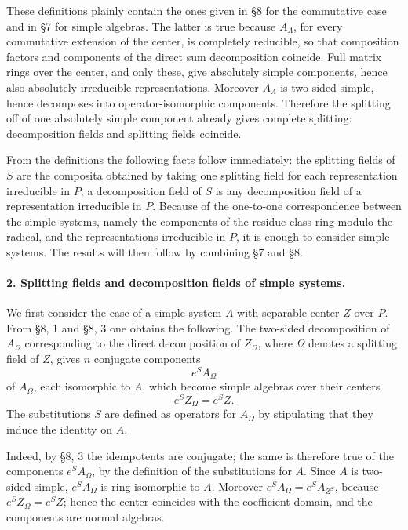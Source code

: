 \documentclass[11pt]{article}
\begin{document}
These definitions plainly contain the ones given in §8 for the commutative case and in §7 for simple algebras. The latter is true because \(A_\Lambda\), for every commutative extension of the center, is completely reducible, so that composition factors and components of the direct sum decomposition coincide. Full matrix rings over the center, and only these, give absolutely simple components, hence also absolutely irreducible representations. Moreover \(A_\Lambda\) is two-sided simple, hence decomposes into operator-isomorphic components. Therefore the splitting off of one absolutely simple component already gives complete splitting: decomposition fields and splitting fields coincide.

From the definitions the following facts follow immediately: the splitting fields of \(S\) are the composita obtained by taking one splitting field for each representation irreducible in \(P\); a decomposition field of \(S\) is any decomposition field of a representation irreducible in \(P\). Because of the one-to-one correspondence between the simple systems, namely the components of the residue-class ring modulo the radical, and the representations irreducible in \(P\), it is enough to consider simple systems. The results will then follow by combining §7 and §8.

\paragraph{2. Splitting fields and decomposition fields of simple systems.}
We first consider the case of a simple system \(A\) with separable center \(Z\) over \(P\). From §8, 1 and §8, 3 one obtains the following. The two-sided decomposition of \(A_\Omega\) corresponding to the direct decomposition of \(Z_\Omega\), where \(\Omega\) denotes a splitting field of \(Z\), gives \(n\) conjugate components
\[
        e^S A_\Omega
\]
of \(A_\Omega\), each isomorphic to \(A\), which become simple algebras over their centers
\[
        e^S Z_\Omega=e^S Z .
\]
The substitutions \(S\) are defined as operators for \(A_\Omega\) by stipulating that they induce the identity on \(A\).

Indeed, by §8, 3 the idempotents are conjugate; the same is therefore true of the components \(e^S A_\Omega\), by the definition of the substitutions for \(A\). Since \(A\) is two-sided simple, \(e^S A_\Omega\) is ring-isomorphic to \(A\). Moreover \(e^SA_\Omega=e^S A_{Z^S}\), because \(e^S Z_\Omega=e^S Z\); hence the center coincides with the coefficient domain, and the components are normal algebras.
\end{document}
